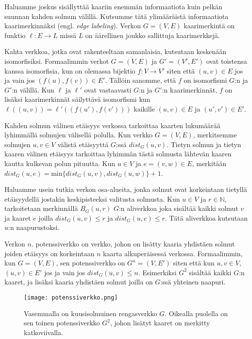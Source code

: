 \documentclass[12pt,finnish]{tktltiki2}
\theoremstyle{definition}
\theoremstyle{remark}
\begin{document}
Haluamme joskus sisällyttää kaariin enemmän informaatiota kuin pelkän suunnan kahden solmun välillä. Kutsumme tätä ylimääräistä informaatiota kaarimerkinnäksi (engl. \textit{edge labeling}). Verkon $G = (V, E)$ kaarimerkintä on funktio $\ell: E \rightarrow L$ missä $L$ on äärellinen joukko sallittuja kaarimerkkejä.

Kahta verkkoa, jotka ovat rakenteeltaan samanlaisia, kutsutaan keskenään isomorfisiksi. Formaalimmin verkot $G = (V, E)$ ja $G' = (V', E')$ ovat toistensa kanssa isomorfisia, kun on olemassa bijektio $f: V \rightarrow V'$ siten että $(u, v) \in E$ jos ja vain jos $(f(u), f(v)) \in E'$. Tällöin sanomme, että $f$ on isomorfismi $G$:n ja $G'$:n välillä. Kun $\ell$ ja $\ell'$ ovat vastaavasti $G$:n ja $G'$:n kaarimerkinnät, $f$ on lisäksi kaarimerkinnät säilyttävä isomorfismi kun $\ell((u, v)) = \ell'((f(u'), f(v')))$ kaikille $(u, v) \in E$ ja $(u', v') \in E'$.

Kahden solmun välinen etäisyys verkossa tarkoittaa kaarten lukumäärää lyhimmällä solmujen välisellä polulla. Kun verkko $G = (V, E)$, merkitsemme solmujen $u, v \in V$ välistä etäisyyttä $G$:ssä $dist_G(u, v)$. Tietyn solmun ja tietyn kaaren välinen etäisyys tarkoittaa lyhimmän tästä solmusta lähtevän kaaren kautta kulkevan polun pituutta. Kun $u \in V$ ja $e = (v, w) \in E$, merkitään $dist_G(u, e) = \text{min}\{dist_G(u, v), dist_G(u, w)\} + 1$.

Haluamme usein tutkia verkon osa-alueita, jonka solmut ovat korkeintaan tietyllä etäisyydellä jostakin keskipisteeksi valitusta solmusta. Kun $u \in V$ ja $r \in \mathbb{N}$, tarkoitetaan merkinnällä $B_G(u, r)$ $G$:n aliverkkoa joka sisältää kaikki solmut $v$ ja kaaret $e$ joilla $dist_G(u, v) \leq r$ ja $dist_G(u, e) \leq r$. Tätä aliverkkoa kutsutaan $u$:n naapurustoksi.

Verkon $n.$ potenssiverkko on verkko, johon on lisätty kaaria yhdistäen solmut joiden etäisyys on korkeintaan $n$ kaarta alkuperäisessä verkossa. Formaalimmin, kun $G = (V, E)$, sen potenssiverkko on $G^n = (V, E')$ siten että kun $u, v \in V$, $(u, v) \in E'$ jos ja vain jos $dist_G(u, v) \leq n$. Esimerkiksi $G^2$ sisältää kaikki $G$:n kaaret, ja lisäksi kaaria yhdistäen solmut joilla on $G$:ssä yhteinen naapuri.
\begin{figure}
  \texttt{[image: potenssiverkko.png]}
  \caption{Vasemmalla on kuusisolmuinen rengasverkko $G$. Oikealla puolella on sen toinen potenssiverkko $G^2$, johon lisätyt kaaret on merkitty katkoviivalla.}
\end{figure}
\end{document}
